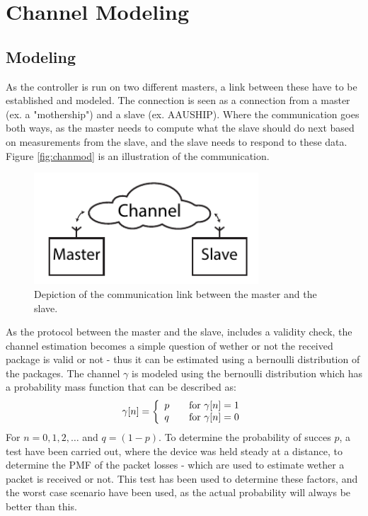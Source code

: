 \chapter{Channel Modeling}
\section{Modeling}
As the controller is run on two different masters, a link between these have to be established and modeled. The connection is seen as a connection from a master (ex. a "mothership") and a slave (ex. AAUSHIP). Where the communication goes both ways, as the master needs to compute what the slave should do next based on measurements from the slave, and the slave needs to respond to these data. Figure \vref{fig:chanmod} is an illustration of the communication. 

\begin{figure}[htbp]
		\begin{center}
			\includegraphics[width=8.4cm]{img/chanmod}
			\caption{Depiction of the communication link between the master and the slave.}
			\label{fig:chanmod}
		\end{center}
\end{figure}

As the protocol between the master and the slave, includes a validity check, the channel estimation becomes a simple question of wether or not the received package is valid or not - thus it can be estimated using a bernoulli distribution of the packages. The channel $\gamma$ is modeled using the bernoulli distribution which has a probability mass function that can be described as:
\begin{align}
\gamma[n] = 
\left\{ 
  \begin{array}{l l}
    p & \quad \text{for}\,\, \gamma[n] = 1\\
    q & \quad \text{for}\,\, \gamma[n] = 0
  \end{array} \right.
\end{align}
For $n = 0,1,2,\dots$ and $q = (1-p)$. To determine the probability of succes $p$, a test have been carried out, where the device was held steady at a distance, to determine the PMF of the packet losses - which are used to estimate wether a packet is received or not. This test has been used to determine these factors, and the worst case scenario have been used, as the actual probability will always be better than this. 

